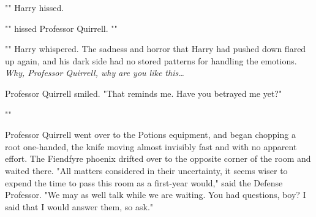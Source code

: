 "" Harry hissed.

"" hissed Professor Quirrell.
""

"" Harry whispered. The sadness and horror that Harry had pushed
down flared up again, and his dark side had no stored patterns for handling the
emotions. \emph{Why, Professor Quirrell, why are you like this{\ldots}}

Professor Quirrell smiled. "That reminds me. Have you betrayed me yet?"

""

Professor Quirrell went over to the Potions equipment, and began chopping a
root one-handed, the knife moving almost invisibly fast and with no apparent
effort. The Fiendfyre phoenix drifted over to the opposite corner of the room
and waited there. "All matters considered in their uncertainty, it seems wiser
to expend the time to pass this room as a first-year would," said the Defense
Professor. "We may as well talk while we are waiting. You had questions, boy? I
said that I would answer them, so ask."
